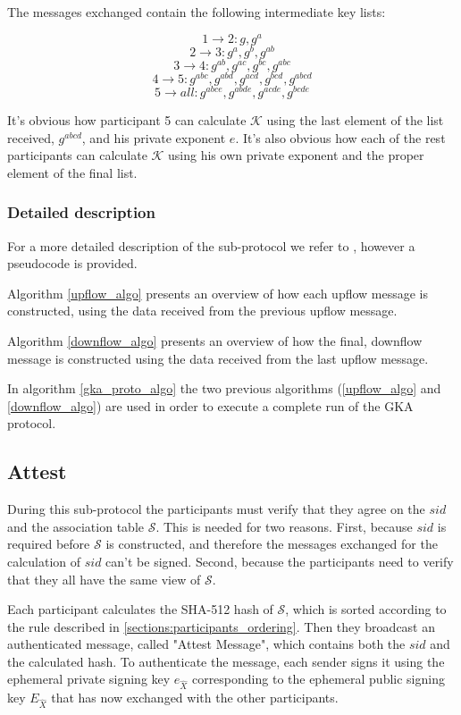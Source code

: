 The messages exchanged contain the following intermediate key lists:

\[ 1 \rightarrow 2: g, g^a \]
\[ 2 \rightarrow 3: g^a, g^b, g^{ab} \]
\[ 3 \rightarrow 4: g^{ab}, g^{ac}, g^{bc}, g^{abc} \]
\[ 4 \rightarrow 5: g^{abc}, g^{abd}, g^{acd}, g^{bcd}, g^{abcd} \]
\[ 5 \rightarrow all: g^{abce}, g^{abde}, g^{acde}, g^{bcde} \]

It's obvious how participant 5 can calculate $\mathcal{K}$ using the last element of the list received, $g^{abcd}$, and his private exponent $e$. It's also obvious how each of the rest participants can calculate $\mathcal{K}$ using his own private exponent and the proper element of the final list.

\subsubsection{Detailed description}
For a more detailed description of the sub-protocol we refer to \cite{mpenc}, however a pseudocode is provided.

Algorithm \ref{upflow_algo} presents an overview of how each upflow message is constructed, using the data received from the previous upflow message.

Algorithm \ref{downflow_algo} presents an overview of how the final, downflow message is constructed using the data received from the last upflow message.

In algorithm \ref{gka_proto_algo} the two previous algorithms (\ref{upflow_algo} and \ref{downflow_algo}) are used in order to execute a complete run of the GKA protocol.

\subsection{Attest}
\label{subsections:attest}
During this sub-protocol the participants must verify that they agree on the $sid$ and the association table $\mathcal{S}$. This is needed for two reasons. First, because $sid$ is required before $\mathcal{S}$ is constructed, and therefore the messages exchanged for the calculation of $sid$ can't be signed. Second, because the participants need to verify that they all have the same view of $\mathcal{S}$.

Each participant calculates the SHA-512 hash of $\mathcal{S}$, which is sorted according to the rule described in \ref{sections:participants_ordering}. Then they broadcast an authenticated message, called "Attest Message", which contains both the $sid$ and the calculated hash. To authenticate the message, each sender signs it using the ephemeral private signing key $e_{\hat{X}}$ corresponding to the ephemeral public signing key $E_{\hat{X}}$ that has now exchanged with the other participants.

